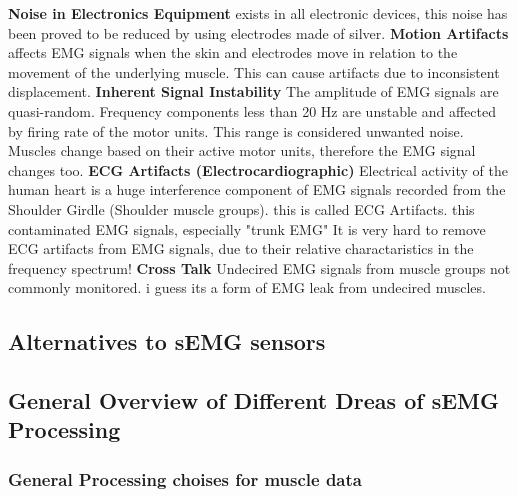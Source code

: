 \documentclass[../main.tex]{subfiles}
\begin{document}
\textbf{Noise in Electronics Equipment} exists in all electronic devices, this noise has been proved to be reduced by using electrodes made of silver.
\textbf{Motion Artifacts} affects EMG signals when the skin and electrodes move in relation to the movement of the underlying muscle.
This can cause artifacts due to inconsistent displacement.
\textbf{Inherent Signal Instability}
The amplitude of EMG signals are quasi-random. Frequency components less than 20 Hz are unstable and affected by firing rate of the motor units. This range is considered unwanted noise. Muscles change based on their active motor units, therefore the EMG signal changes too.
\textbf{ECG Artifacts (Electrocardiographic)}
Electrical activity of the human heart is a huge interference component of EMG signals recorded from the Shoulder Girdle (Shoulder muscle groups).
this is called ECG Artifacts.
this contaminated EMG signals, especially "trunk EMG"
It is very hard to remove ECG artifacts from EMG signals, due to their relative charactaristics in the frequency spectrum!
\textbf{Cross Talk} Undecired EMG signals from muscle groups not commonly monitored. i guess its a form of EMG leak from undecired muscles.





\subsection{Alternatives to sEMG sensors}




\subsection{General Overview of Different Dreas of sEMG Processing}


\subsubsection{General Processing choises for muscle data}
\end{document}
